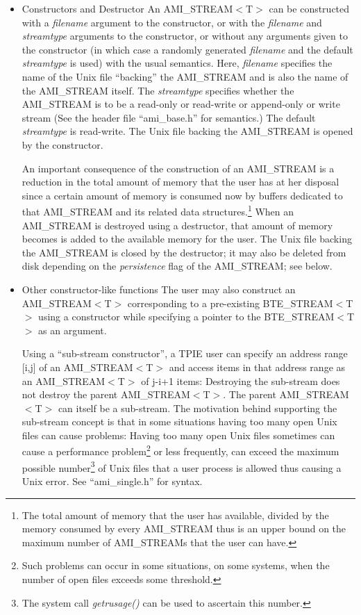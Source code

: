 \begin{itemize}
\item{Constructors and Destructor} An AMI\_STREAM$<$T$>$ can be constructed 
with a \emph{filename} argument
to the constructor, or with the \emph{filename} and \emph{streamtype}
arguments to the constructor, or  without any
arguments given to the constructor (in which case a randomly generated
\emph{filename} and the default \emph{streamtype} is used)
with the usual semantics. Here,
\emph{filename} specifies the name of the Unix file ``backing'' the
AMI\_STREAM and is also the name of the AMI\_STREAM itself. The
\emph{streamtype} specifies whether the AMI\_STREAM is to be a 
read-only or read-write or append-only or write stream (See the header file
``ami\_base.h'' for semantics.) The default  \emph{streamtype} is read-write. 
The Unix file backing the AMI\_STREAM is opened by the constructor.


An important consequence of the construction of an AMI\_STREAM is a
reduction in the total amount of memory that the user has at her
disposal since a certain amount of memory is consumed now by buffers
dedicated to that AMI\_STREAM and its related data
structures.\footnote{The total amount of memory that the user has
available, divided by the memory consumed by every AMI\_STREAM thus
is an upper bound on the maximum number of AMI\_STREAMs that the user
can have.} When an AMI\_STREAM is destroyed using a destructor, that
amount of memory becomes is added to the available memory for the
user. The Unix file backing the AMI\_STREAM is closed by the
destructor; it may also be deleted from disk 
depending on the \emph{persistence} flag of
the AMI\_STREAM; see below.


\item {Other constructor-like functions}
The user may also construct an AMI\_STREAM$<$T$>$ corresponding to a
pre-existing BTE\_STREAM$<$T$>$ using a constructor while
specifying a pointer to the BTE\_STREAM$<$T$>$ as an argument.

Using a ``sub-stream constructor'',
a TPIE user can specify an address range [i,j]
of an AMI\_STREAM$<$T$>$ and access items in that address range
as an AMI\_STREAM$<$T$>$ of j-i+1 items: Destroying the sub-stream
does not destroy the parent AMI\_STREAM$<$T$>$. The parent
AMI\_STREAM$<$T$>$ can itself be a sub-stream. The motivation behind 
supporting the sub-stream concept is that in some situations
having too many open Unix files can cause problems: 
Having too many open Unix files 
sometimes can cause a performance problem\footnote{Such
problems can occur in some situations, on some systems,
when the number of open files exceeds some threshold.} or
less frequently, can exceed the maximum possible number\footnote{The
system call \emph{getrusage()} can be used to ascertain this number.}
of Unix files that a user process is allowed thus causing a
Unix error. See ``ami\_single.h'' for syntax.



\end{itemize}
